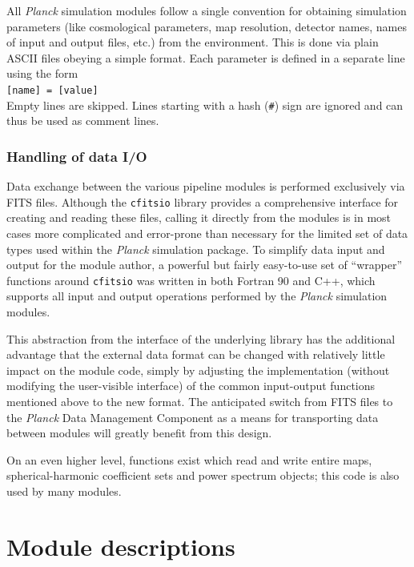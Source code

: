 \documentclass{aa}
\begin{document}
All \emph{Planck} simulation modules follow a single convention for
obtaining simulation parameters (like cosmological parameters, map resolution,
detector names, names of input and output files, etc.) from the environment.
This is done via plain ASCII files obeying a simple format. Each parameter
is defined in a separate line using the form\\
\hspace*{0.3cm}\verb$[name] = [value]$\\
Empty lines are skipped. Lines starting with a hash ({\tt \#}) sign are
ignored and can thus be used as comment lines.

\subsubsection {Handling of data I/O}

Data exchange between the various pipeline modules is performed
exclusively via FITS files. Although the {\tt cfitsio} library
provides a comprehensive interface for creating and reading these
files, calling it directly from the modules is in most cases more
complicated and error-prone than necessary for the limited set of data
types used within the \emph{Planck} simulation package. To simplify
data input and output for the module author, a powerful but fairly
easy-to-use set of ``wrapper'' functions around {\tt cfitsio} was written
in both Fortran
90 and C++, which supports all input and output operations performed
by the \emph{Planck} simulation modules.

This abstraction from the interface of the underlying library has the
additional advantage that the external data format can be changed with
relatively little impact on the module code, simply by adjusting the
implementation (without modifying the user-visible interface)
of the common input-output functions mentioned above to the
new format. The anticipated switch from FITS files to the
\emph{Planck} Data Management Component as a means for transporting
data between modules will greatly benefit from this design.

On an even higher level, functions exist which read and write entire
maps, spherical-harmonic coefficient sets and power spectrum objects;
this code is also used by many modules.

\section {Module descriptions}
\label{modules}
\end{document}
